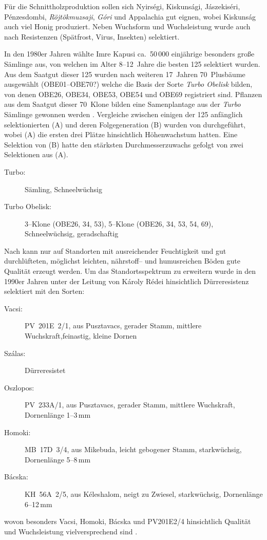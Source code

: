 \documentclass[twocolumn]{scrartcl}
\begin{document}
Für die Schnittholzproduktion sollen sich Nyirségi, Kiskunsági, Jászekiséri,
Pénzesdombi, \emph{Röjtökmuzsaji}, \emph{Góri} und Appalachia gut eignen, wobei
Kiskunság auch viel Honig produziert. Neben Wuchsform und Wuchsleistung wurde
auch nach Resistenzen (Spätfrost, Virus, Insekten) selektiert.

In den 1980er Jahren wählte Imre Kapusi ca.\ 50\,000 einjährige
besonders große Sämlinge aus, von welchen im Alter 8--12~Jahre die
besten 125 selektiert wurden. Aus dem Saatgut dieser 125 wurden nach
weiteren 17~Jahren 70~Plusbäume ausgewählt (OBE01--OBE70?) welche die
Basis der Sorte \emph{Turbo Obelisk} bilden, von denen OBE26, OBE34,
OBE53, OBE54 und OBE69 registriert sind.
Pflanzen aus dem Saatgut dieser 70~Klone bilden eine Samenplantage aus
der \emph{Turbo} Sämlinge gewonnen werden \citep{nemeth2022robinie}.
Vergleiche zwischen einigen der 125 anfänglich selektionierten (A) und
deren Folgegeneration (B) wurden von \citet{barna2009robinieTurbo}
durchgeführt, wobei (A) die ersten drei Plätze hinsichtlich
Höhenwachstum hatten. Eine Selektion von (B) hatte den stärksten
Durchmesserzuwachs gefolgt von zwei Selektionen aus (A).

\begin{description}
  \item[Turbo:] Sämling, Schneelwüchsig \citep{nemeth2022robinie}
  \item[Turbo Obelisk:] 3--Klone (OBE26, 34, 53), 5--Klone (OBE26, 34, 53, 54, 69), Schneelwüchsig, geradschaftig \citep{nemeth2022robinie}
\end{description}

Nach \citet{redei2008robinieImprovement} kann nur auf Standorten mit
ausreichender Feuchtigkeit und gut durchlüfteten, möglichst leichten,
nährstoff-- und humusreichen Böden gute Qualität erzeugt werden. Um
das Standortsspektrum zu erweitern wurde in
den 1990er Jahren unter der Leitung von Károly Rédei
hinsichtlich Dürreresistenz selektiert mit den Sorten:
\begin{description}
  \item[Vacsi:] PV~201E~2/1, aus Pusztavacs, gerader Stamm, mittlere Wuchskraft,feinastig, kleine Dornen
  \item[Szálas:] Dürreresistet
  \item[Oszlopos:] PV~233A/1, aus Pusztavacs, gerader Stamm, mittlere Wuchskraft, Dornenlänge 1--3\,mm
  \item[Homoki:] MB~17D~3/4, aus Mikebuda, leicht gebogener Stamm, starkwüchsig, Dornenlänge 5--8\,mm
  \item[Bácska:] KH~56A~2/5, aus Kéleshalom, neigt zu Zwiesel, starkwüchsig, Dornenlänge 6--12\,mm
\end{description}
wovon besonders Vacsi, Homoki, Bácska und PV201E2/4 hinsichtlich Qualität und Wuchsleistung vielversprechend
sind \citep{redei2018robinieImprovement,keserue2021robinie,abri2023robinieUngarn,abri2024dis}.
\end{document}

